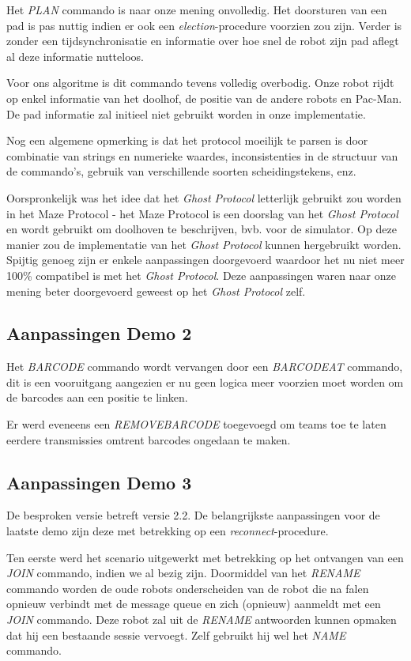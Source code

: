 \documentclass[12pt,a4paper]{report}
\begin{document}
Het \emph{PLAN} commando is naar onze mening onvolledig. Het doorsturen van een pad is pas nuttig indien er ook een \emph{election}-procedure voorzien zou zijn. Verder is zonder een tijdsynchronisatie en informatie over hoe snel de robot zijn pad aflegt al deze informatie nutteloos.

Voor ons algoritme is dit commando tevens volledig overbodig. Onze robot rijdt op enkel informatie van het doolhof, de positie van de andere robots en Pac-Man. De pad informatie zal initieel niet gebruikt worden in onze implementatie.

Nog een algemene opmerking is dat het protocol moeilijk te parsen is door combinatie van strings en numerieke waardes, inconsistenties in de structuur van de commando's, gebruik van verschillende soorten scheidingstekens, enz.

Oorspronkelijk was het idee dat het \emph{Ghost Protocol} letterlijk gebruikt zou worden in het Maze Protocol - het Maze Protocol is een doorslag van het \emph{Ghost Protocol} en wordt gebruikt om doolhoven te beschrijven, bvb. voor de simulator. Op deze manier zou de implementatie van het \emph{Ghost Protocol} kunnen hergebruikt worden. Spijtig genoeg zijn er enkele aanpassingen doorgevoerd waardoor het nu niet meer 100\% compatibel is met het \emph{Ghost Protocol}. Deze aanpassingen waren naar onze mening beter doorgevoerd geweest op het \emph{Ghost Protocol} zelf.

\subsection{Aanpassingen Demo 2}

Het \emph{BARCODE} commando wordt vervangen door een \emph{BARCODEAT} commando, dit is een vooruitgang aangezien er nu geen logica meer voorzien moet worden om de barcodes aan een positie te linken. 

Er werd eveneens een \emph{REMOVEBARCODE} toegevoegd om teams toe te laten eerdere transmissies omtrent barcodes ongedaan te maken.

\subsection{Aanpassingen Demo 3}

De besproken versie betreft versie 2.2. De belangrijkste aanpassingen voor de laatste demo zijn deze met betrekking op een \emph{reconnect}-procedure.

Ten eerste werd het scenario uitgewerkt met betrekking op het ontvangen van een \emph{JOIN} commando, indien we al bezig zijn. Doormiddel van het \emph{RENAME} commando worden de oude robots onderscheiden van de robot die na falen opnieuw verbindt met de message queue en zich (opnieuw) aanmeldt met een \emph{JOIN} commando. Deze robot zal uit de \emph{RENAME} antwoorden kunnen opmaken dat hij een bestaande sessie vervoegt. Zelf gebruikt hij wel het \emph{NAME} commando.
\end{document}
